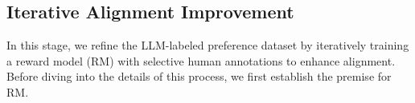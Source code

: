 
\subsection{Iterative Alignment Improvement}
\label{sec:design:pref_learn}
In this stage, we refine the LLM-labeled preference dataset by iteratively training a reward model (RM) with selective human annotations to enhance alignment. Before diving into the details of this process, we first establish the premise for RM.

